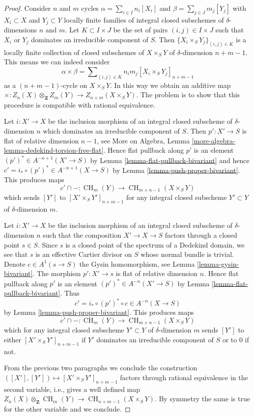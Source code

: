 \documentclass[10pt,a4paper]{amsart}
\theoremstyle{plain}
\theoremstyle{definition}
\theoremstyle{remark}
\numberwithin{equation}{subsection}
\def\CH{\mathop{\mathrm{CH}}\nolimits}
\begin{document}
\begin{proof}
Consider $n$ and $m$ cycles $\alpha = \sum_{i \in I} n_i[X_i]$
and $\beta = \sum_{j \in J} m_j[Y_j]$ with $X_i \subset X$ and $Y_j \subset Y$
locally finite families of integral closed subschemes of
$\delta$-dimensions $n$ and $m$. Let $K \subset I \times J$ be the set
of pairs $(i, j) \in I \times J$ such that $X_i$ or $Y_j$ dominates
an irreducible component of $S$.
Then $\{X_i \times_S Y_j\}_{(i, j) \in K}$ is a locally finite
collection of closed subschemes of $X \times_S Y$ of
$\delta$-dimension $n + m - 1$. This means we can indeed consider
$$
\alpha \times \beta =
\sum\nolimits_{(i, j) \in K} n_i m_j [X_i \times_S Y_j]_{n + m - 1}
$$
as a $(n + m - 1)$-cycle on $X \times_S Y$. In this way we obtain an
additive map
$\times : Z_n(X) \otimes_{\mathbf{Z}} Z_m(Y) \to Z_{n + m}(X \times_S Y)$.
The problem is to show that
this procedure is compatible with rational equivalence.

\medskip\noindent
Let $i : X' \to X$ be the inclusion morphism of an integral closed subscheme
of $\delta$-dimension $n$ which dominates an irreducible component
of $S$. Then $p' : X' \to S$ is flat of relative dimension $n - 1$, see
More on Algebra, Lemma \ref{more-algebra-lemma-dedekind-torsion-free-flat}.
Hence flat pullback along $p'$ is an element
$(p')^* \in A^{-n + 1}(X' \to S)$ by
Lemma \ref{lemma-flat-pullback-bivariant}
and hence $c' = i_* \circ (p')^* \in A^{-n + 1}(X \to S)$ by
Lemma \ref{lemma-push-proper-bivariant}.
This produces maps
$$
c' \cap - : \CH_m(Y) \longrightarrow \CH_{m + n - 1}(X \times_S Y)
$$
which sends $[Y']$ to $[X' \times_S Y']_{n + m - 1}$ for any
integral closed subscheme $Y' \subset Y$ of $\delta$-dimension $m$.

\medskip\noindent
Let $i : X' \to X$ be the inclusion morphism of an integral closed subscheme
of $\delta$-dimension $n$ such that the composition $X' \to X \to S$ 
factors through a closed point $s \in S$. Since $s$ is a closed point
of the spectrum of a Dedekind domain, we see that $s$ is an effective
Cartier divisor on $S$ whose normal bundle is trivial. Denote
$c \in A^1(s \to S)$ the Gysin homomorphism, see
Lemma \ref{lemma-gysin-bivariant}. The morphism $p' : X' \to s$
is flat of relative dimension $n$. Hence flat pullback along $p'$
is an element $(p')^* \in A^{-n}(X' \to S)$ by
Lemma \ref{lemma-flat-pullback-bivariant}.
Thus
$$
c' = i_* \circ (p')^* \circ c \in A^{-n}(X \to S)
$$
by Lemma \ref{lemma-push-proper-bivariant}. This produces maps
$$
c' \cap - : \CH_m(Y) \longrightarrow \CH_{m + n - 1}(X \times_S Y)
$$
which for any integral closed subscheme $Y' \subset Y$
of $\delta$-dimension $m$
sends $[Y']$ to either $[X' \times_S Y']_{n + m - 1}$ if $Y'$ dominates
an irreducible component of $S$ or to $0$ if not.

\medskip\noindent
From the previous two paragraphs we conclude
the construction $([X'], [Y']) \mapsto [X' \times_S Y']_{n + m - 1}$
factors through rational equivalence in the second variable, i.e.,
gives a well defined map
$Z_n(X) \otimes_{\mathbf{Z}} \CH_m(Y) \to \CH_{n + m - 1}(X \times_S Y)$.
By symmetry the same is true for the other variable and we conclude.
\end{proof}
\end{document}

